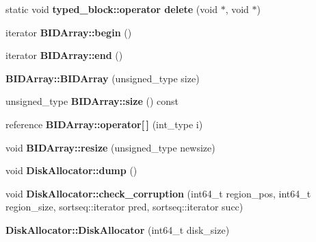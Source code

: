 \begin{CompactItemize}
\item 
\hypertarget{group__mnglayer_gcaec0a5f3e2d6ff44e1d7fa30ff602b5}{
static void \textbf{typed\_\-block::operator delete} (void $\ast$, void $\ast$)}
\label{group__mnglayer_gcaec0a5f3e2d6ff44e1d7fa30ff602b5}

\item 
\hypertarget{group__mnglayer_gd0be75ac7ac1aee77eac786943989f35}{
iterator \textbf{BIDArray::begin} ()}
\label{group__mnglayer_gd0be75ac7ac1aee77eac786943989f35}

\item 
\hypertarget{group__mnglayer_g37415deef92aeff02a1d5f09feb83549}{
iterator \textbf{BIDArray::end} ()}
\label{group__mnglayer_g37415deef92aeff02a1d5f09feb83549}

\item 
\hypertarget{group__mnglayer_g95efb3da196f2be6f40c683e46200b7a}{
\textbf{BIDArray::BIDArray} (unsigned\_\-type size)}
\label{group__mnglayer_g95efb3da196f2be6f40c683e46200b7a}

\item 
\hypertarget{group__mnglayer_g48f9347c6cc69bea869720181c9a4752}{
unsigned\_\-type \textbf{BIDArray::size} () const }
\label{group__mnglayer_g48f9347c6cc69bea869720181c9a4752}

\item 
\hypertarget{group__mnglayer_g70d97a7a58384f90e5aa23b406d637d4}{
reference \textbf{BIDArray::operator\mbox{[}$\,$\mbox{]}} (int\_\-type i)}
\label{group__mnglayer_g70d97a7a58384f90e5aa23b406d637d4}

\item 
\hypertarget{group__mnglayer_g2475ec3e07ee2ac98cc584578a4f2807}{
void \textbf{BIDArray::resize} (unsigned\_\-type newsize)}
\label{group__mnglayer_g2475ec3e07ee2ac98cc584578a4f2807}

\item 
\hypertarget{group__mnglayer_geb9c480bba4d1e8dd8d33e79e905cb78}{
void \textbf{DiskAllocator::dump} ()}
\label{group__mnglayer_geb9c480bba4d1e8dd8d33e79e905cb78}

\item 
\hypertarget{group__mnglayer_gc9eea25bdfd7455c592bf7080594d8e6}{
void \textbf{DiskAllocator::check\_\-corruption} (int64\_\-t region\_\-pos, int64\_\-t region\_\-size, sortseq::iterator pred, sortseq::iterator succ)}
\label{group__mnglayer_gc9eea25bdfd7455c592bf7080594d8e6}

\item 
\hypertarget{group__mnglayer_gb4c3a46fa5f537cce92ed9562dbd4d80}{
\textbf{DiskAllocator::DiskAllocator} (int64\_\-t disk\_\-size)}
\label{group__mnglayer_gb4c3a46fa5f537cce92ed9562dbd4d80}


\end{CompactItemize}
